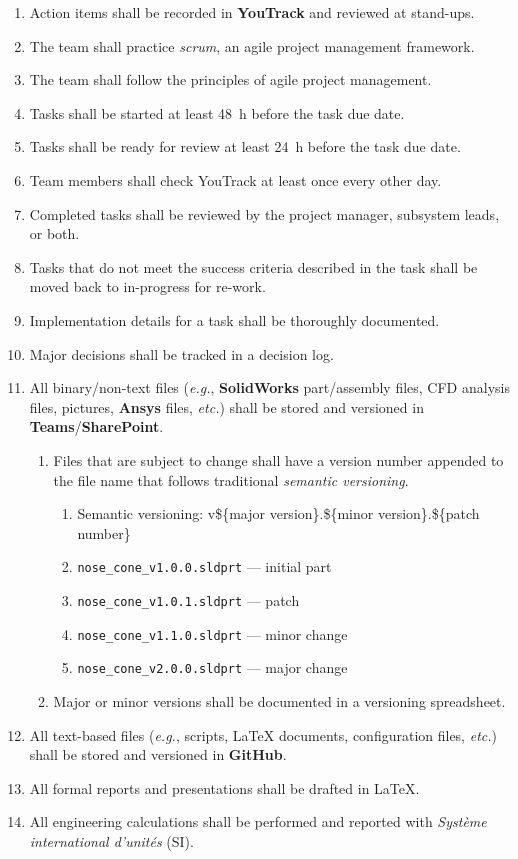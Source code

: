 \begin{enumerate}
    \item Action items shall be recorded in \textbf{YouTrack} and reviewed at stand-ups.
    \item The team shall practice \textit{scrum}, an agile project management framework.
    \item The team shall follow the principles of agile project management.
    \item Tasks shall be started at least \qty{48}{\hour} before the task due date.
    \item Tasks shall be ready for review at least \qty{24}{\hour} before the task due date.
    \item Team members shall check YouTrack at least once every other day.
    \item Completed tasks shall be reviewed by the project manager, subsystem leads, or both.
    \item Tasks that do not meet the success criteria described in the task shall be moved back to in-progress for re-work. 
    \item Implementation details for a task shall be thoroughly documented.
    \item Major decisions shall be tracked in a decision log.
    \item All binary/non-text files (\textit{e.g.}, \textbf{SolidWorks} part/assembly files, CFD analysis files, pictures, \textbf{Ansys} files, \textit{etc.}) shall be stored and versioned in \textbf{Teams}/\textbf{SharePoint}.
    \begin{enumerate}
        \item Files that are subject to change shall have a version number appended to the file name that follows traditional \textit{semantic versioning}.
        \begin{enumerate}
            \item Semantic versioning: v\$\{major version\}.\$\{minor version\}.\$\{patch number\}
            \item \verb|nose_cone_v1.0.0.sldprt| — initial part
            \item \verb|nose_cone_v1.0.1.sldprt| — patch
            \item \verb|nose_cone_v1.1.0.sldprt| — minor change
            \item \verb|nose_cone_v2.0.0.sldprt| — major change
        \end{enumerate}
        \item Major or minor versions shall be documented in a versioning spreadsheet.
    \end{enumerate}
    \item All text-based files (\textit{e.g.}, scripts, \LaTeX{} documents, configuration files, \textit{etc.}) shall be stored and versioned in \textbf{GitHub}.
    \item All formal reports and presentations shall be drafted in \LaTeX.
    \item All engineering calculations shall be performed and reported with \textit{Système international d'unités} (SI).
\end{enumerate}

